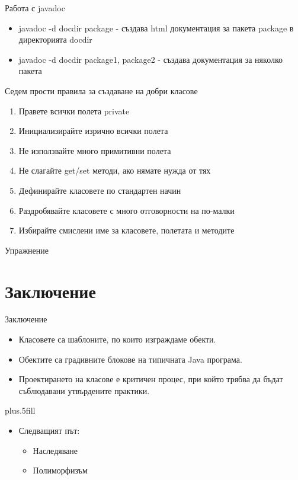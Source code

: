 \documentclass{beamer}
\begin{document}
\begin{frame}{Работа с javadoc}
  \transdissolve
  \begin{itemize}
  \item javadoc -d docdir package - създава html
    документация за пакета package в
    директорията docdir
  \item javadoc -d docdir package1, package2 - създава документация за няколко пакета
  \end{itemize}
\end{frame}

\begin{frame}{Седем прости правила за създаване на добри класове}
  \transdissolve
  \begin{enumerate}
    \item Правете всички полета private
    \item Инициализирайте изрично всички полета
    \item Не използвайте много примитивни полета
    \item Не слагайте get/set методи, ако нямате нужда от тях
    \item Дефинирайте класовете по стандартен начин
    \item Раздробявайте класовете с много отговорности на по-малки
    \item Избирайте смислени име за класовете, полетата и методите
  \end{enumerate}
\end{frame}

\begin{frame}{Упражнение}
  \transdissolve
  
\end{frame}

\section*{Заключение}

\begin{frame}{Заключение}
  \transdissolve
  \begin{itemize}
  \item
    Класовете са шаблоните, по които изграждаме обекти.
  \item
    Обектите са градивните блокове на типичната Java програма.
  \item
    Проектирането на класове е критичен процес, при който трябва да
    бъдат съблюдавани утвърдените практики.
  \end{itemize}
  
  \vskip0pt plus.5fill
  \begin{itemize}
  \item
    Следващият път:
    \begin{itemize}
    \item
      Наследяване
    \item
      Полиморфизъм
    \end{itemize}
  \end{itemize}
\end{frame}
\end{document}
